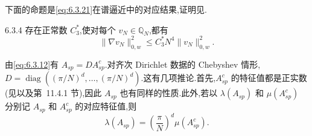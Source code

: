 下面的命题是\eqref{eq:6.3.21}在谱逼近中的对应结果,证明见.

\begin{proposition}[代数多项式的逆不等式]{6.3.4}
存在正常数 \(C_3^*\),使对每个 \(v_N\in\mathbb Q_N\),都有
\begin{equation}\label{eq:6.3.27}
  \|\nabla v_N\|_{0,w}^2\le C_3^*N^4\|v_N\|_{0,w}^2.
\end{equation}
\end{proposition}

由\eqref{eq:6.3.12}有 \(A_{sp}=DA_{sp}^c\).对齐次 Dirichlet 数据的 Chebyshev 情形,\(D=\operatorname{diag}((\pi/N)^d,\ldots,(\pi/N)^d)\).这有几项推论.首先,\(A_{sp}^c\) 的特征值都是正实数(见以及第~11.4.1 节),因此 \(A_{sp}\) 也有同样的性质.此外,若以 \(\lambda(A_{sp})\) 和 \(\mu(A_{sp}^c)\) 分别记 \(A_{sp}\) 和 \(A_{sp}^c\) 的对应特征值,则
\begin{equation}\label{eq:6.3.28}
  \lambda(A_{sp})=\left(\frac{\pi}{N}\right)^d\mu(A_{sp}^c).
\end{equation}

